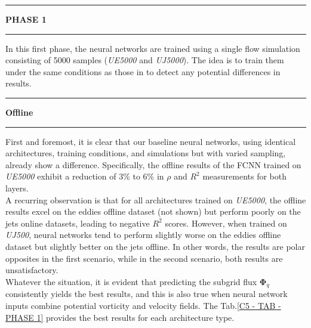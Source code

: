 \newpage


%
%
\rule[0cm]{\linewidth}{0.075cm}
\begin{center}
\Large \textbf{PHASE 1}
\end{center}
\vspace{0.15cm}
\rule[0.3cm]{\linewidth}{0.075cm}
	
In this first phase, the neural networks are trained using a single flow simulation consisting of 5000 samples (\textit{UE5000} and \textit{UJ5000}). The idea is to train them under the same conditions as those in \cite{Benchmarking} to detect any potential differences in results.\\

\rule[0cm]{\linewidth}{0.025cm}
\begin{center}
\small \textbf{Offline}
\end{center}
\rule[0.3cm]{\linewidth}{0.025cm}

First and foremost, it is clear that our baseline neural networks, using identical architectures, training conditions, and simulations but with varied sampling, already show a difference. Specifically, the offline results of the FCNN trained on \textit{UE5000} exhibit a reduction of 3\% to 6\% in $\rho$ and $R^2$ measurements for both layers.\\ 

A recurring observation is that for all architectures trained on \textit{UE5000}, the offline results excel on the eddies offline dataset (not shown) but perform poorly on the jets online datasets, leading to negative $R^2$ scores. However, when trained on \textit{UJ500}, neural networks tend to perform slightly worse on the eddies offline dataset but slightly better on the jets offline. In other words, the results are polar opposites in the first scenario, while in the second scenario, both results are unsatisfactory.\\

Whatever the situation, it is evident that predicting the subgrid flux $\mathbf{\Phi}_q$ consistently yields the best results, and this is also true when neural network inputs combine potential vorticity and velocity fields. The Tab.\ref{C5 - TAB - PHASE 1} provides the best results for each architecture type.\\ 

